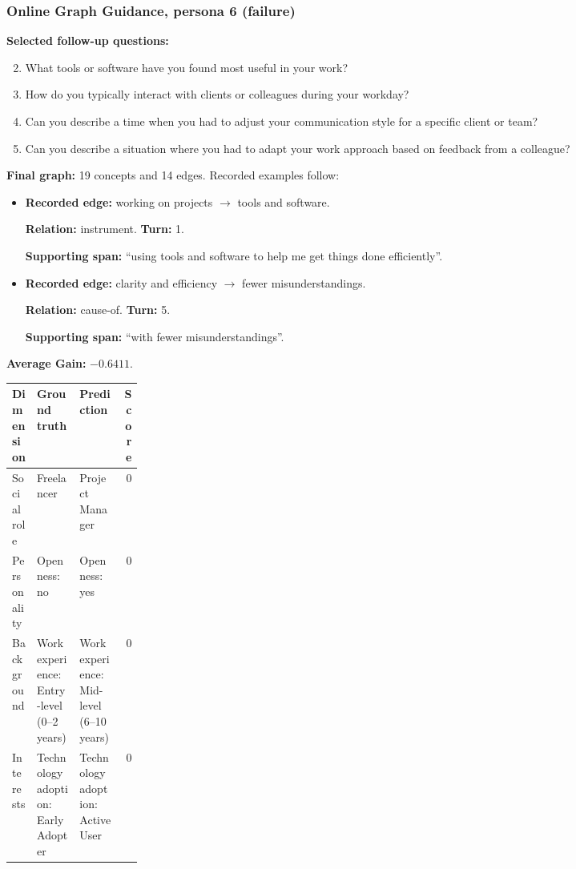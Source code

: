 \documentclass{ieeeaccess}
\begin{document}
\begin{multicols*}{2}
\subsubsection{Online Graph Guidance, persona 6 (failure)}
\noindent\textbf{Selected follow-up questions:}\par\nopagebreak[4]
\begin{enumerate}
\setcounter{enumi}{1}
\item What tools or software have you found most useful in your work?
\item How do you typically interact with clients or colleagues during your workday?
\item Can you describe a time when you had to adjust your communication style for a specific client or team?
\item Can you describe a situation where you had to adapt your work approach based on feedback from a colleague?
\end{enumerate}
\noindent\textbf{Final graph:} 19 concepts and 14 edges. Recorded examples follow:\par\nopagebreak[4]
\begin{itemize}
\item \textbf{Recorded edge:} working on projects $\rightarrow$ tools and software.
\par\textbf{Relation:} instrument. \textbf{Turn:} 1.
\par\textbf{Supporting span:} ``using tools and software to help me get things done efficiently''.
\item \textbf{Recorded edge:} clarity and efficiency $\rightarrow$ fewer misunderstandings.
\par\textbf{Relation:} cause-of. \textbf{Turn:} 5.
\par\textbf{Supporting span:} ``with fewer misunderstandings''.
\end{itemize}
\noindent\begin{minipage}{\linewidth}
\noindent\textbf{Average Gain:} $-0.6411$.\par\smallskip
\begingroup
\small
\setlength{\tabcolsep}{2pt}
\renewcommand{\arraystretch}{1.12}
\noindent\begin{tabularx}{\linewidth}{@{}p{0.19\linewidth}>{\raggedright\arraybackslash}X>{\raggedright\arraybackslash}Xr@{}}
\toprule
Dimension & Ground truth & Prediction & Score \\
\midrule
Social role & Freelancer & Project Manager & 0 \\
\addlinespace[2pt]
Personality & Openness: no & Openness: yes & 0 \\
\addlinespace[2pt]
Background & Work experience: Entry-level (0--2 years) & Work experience: Mid-level (6--10 years) & 0 \\
\addlinespace[2pt]
Interests & Technology adoption: Early Adopter & Technology adoption: Active User & 0 \\
\bottomrule
\end{tabularx}\par
\endgroup
\end{minipage}\par\medskip

\end{multicols*}
\end{document}
